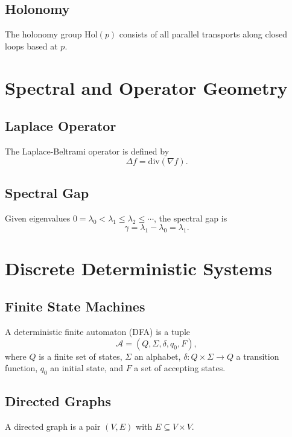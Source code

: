 \documentclass[12pt]{article}
\begin{document}
\subsection{Holonomy}
The holonomy group $\mathrm{Hol}(p)$ consists of all parallel transports along
closed loops based at $p$.


\section{Spectral and Operator Geometry}

\subsection{Laplace Operator}
The Laplace-Beltrami operator is defined by
\[
\Delta f = \mathrm{div}(\nabla f).
\]

\subsection{Spectral Gap}
Given eigenvalues $0 = \lambda_0 < \lambda_1 \le \lambda_2 \le \cdots$,
the spectral gap is
\[
\gamma = \lambda_1 - \lambda_0 = \lambda_1.
\]


\section{Discrete Deterministic Systems}

\subsection{Finite State Machines}
A deterministic finite automaton (DFA) is a tuple
\[
\mathcal{A} = (Q, \Sigma, \delta, q_0, F),
\]
where $Q$ is a finite set of states, $\Sigma$ an alphabet,
$\delta : Q \times \Sigma \to Q$ a transition function,
$q_0$ an initial state, and $F$ a set of accepting states.

\subsection{Directed Graphs}
A directed graph is a pair $(V,E)$ with $E \subseteq V \times V$.
\end{document}
